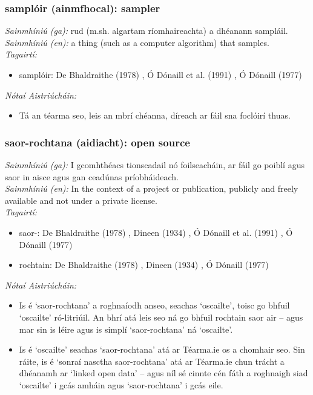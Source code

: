 \subsubsection*{samplóir (ainmfhocal): sampler}
 \noindent \textit{Sainmhíniú (ga):} rud (m.sh. algartam ríomhaireachta) a dhéanann sampláil.
\\
 \noindent \textit{Sainmhíniú (en):} a thing (such as a computer algorithm) that samples.
\\
 \noindent \textit{Tagairtí:}
\begin{itemize}
	\item samplóir: De Bhaldraithe (1978) \cite{de-bhaldraithe}, Ó Dónaill et al. (1991) \cite{focloir-beag}, Ó Dónaill (1977) \cite{odonaill}
\end{itemize}

 \noindent \textit{Nótaí Aistriúcháin:}
\begin{itemize}
	\item Tá an téarma seo, leis an mbrí chéanna, díreach ar fáil sna foclóirí thuas.
\end{itemize}


\subsubsection*{saor-rochtana (aidiacht): open source}
 \noindent \textit{Sainmhíniú (ga):} I gcomhthéacs tionscadail nó foilseacháin, ar fáil go poiblí agus saor in aisce agus gan ceadúnas príobháideach.
\\
 \noindent \textit{Sainmhíniú (en):} In the context of a project or publication, publicly and freely available and not under a private license.
\\
 \noindent \textit{Tagairtí:}
\begin{itemize}
	\item saor-: De Bhaldraithe (1978) \cite{de-bhaldraithe}, Dineen (1934) \cite{dineen}, Ó Dónaill et al. (1991) \cite{focloir-beag}, Ó Dónaill (1977) \cite{odonaill}
	\item rochtain: De Bhaldraithe (1978) \cite{de-bhaldraithe}, Dineen (1934) \cite{dineen}, Ó Dónaill (1977) \cite{odonaill}
\end{itemize}

 \noindent \textit{Nótaí Aistriúcháin:}
\begin{itemize}
	\item Is é `saor-rochtana' a roghnaíodh anseo, seachas `oscailte', toisc go bhfuil `oscailte' ró-litriúil. An bhrí atá leis seo ná go bhfuil rochtain saor air -- agus mar sin is léire agus is simplí `saor-rochtana' ná `oscailte'.
	\item Is é `oscailte' seachas `saor-rochtana' atá ar Téarma.ie os a chomhair seo. Sin ráite, is é `sonraí nasctha saor-rochtana' atá ar Téarma.ie chun trácht a dhéanamh ar `linked open data' -- agus níl sé cinnte cén fáth a roghnaigh siad `oscailte' i gcás amháin agus `saor-rochtana' i gcás eile.
\end{itemize}


